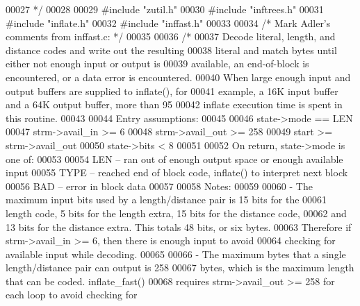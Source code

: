 \begin{DoxyCode}
{00027 \textcolor{comment}{ */}
00028 
00029 \textcolor{preprocessor}{#include "zutil.h"}
00030 \textcolor{preprocessor}{#include "inftrees.h"}
00031 \textcolor{preprocessor}{#include "inflate.h"}
00032 \textcolor{preprocessor}{#include "inffast.h"}
00033 
00034 \textcolor{comment}{/* Mark Adler's comments from inffast.c: */}
00035 
00036 \textcolor{comment}{/*}
00037 \textcolor{comment}{   Decode literal, length, and distance codes and write out the resulting}
00038 \textcolor{comment}{   literal and match bytes until either not enough input or output is}
00039 \textcolor{comment}{   available, an end-of-block is encountered, or a data error is encountered.}
00040 \textcolor{comment}{   When large enough input and output buffers are supplied to inflate(), for}
00041 \textcolor{comment}{   example, a 16K input buffer and a 64K output buffer, more than 95%
00042 \textcolor{comment}{   inflate execution time is spent in this routine.}
00043 \textcolor{comment}{}
00044 \textcolor{comment}{   Entry assumptions:}
00045 \textcolor{comment}{}
00046 \textcolor{comment}{        state->mode == LEN}
00047 \textcolor{comment}{        strm->avail\_in >= 6}
00048 \textcolor{comment}{        strm->avail\_out >= 258}
00049 \textcolor{comment}{        start >= strm->avail\_out}
00050 \textcolor{comment}{        state->bits < 8}
00051 \textcolor{comment}{}
00052 \textcolor{comment}{   On return, state->mode is one of:}
00053 \textcolor{comment}{}
00054 \textcolor{comment}{        LEN -- ran out of enough output space or enough available input}
00055 \textcolor{comment}{        TYPE -- reached end of block code, inflate() to interpret next block}
00056 \textcolor{comment}{        BAD -- error in block data}
00057 \textcolor{comment}{}
00058 \textcolor{comment}{   Notes:}
00059 \textcolor{comment}{}
00060 \textcolor{comment}{    - The maximum input bits used by a length/distance pair is 15 bits for the}
00061 \textcolor{comment}{      length code, 5 bits for the length extra, 15 bits for the distance code,}
00062 \textcolor{comment}{      and 13 bits for the distance extra.  This totals 48 bits, or six bytes.}
00063 \textcolor{comment}{      Therefore if strm->avail\_in >= 6, then there is enough input to avoid}
00064 \textcolor{comment}{      checking for available input while decoding.}
00065 \textcolor{comment}{}
00066 \textcolor{comment}{    - The maximum bytes that a single length/distance pair can output is 258}
00067 \textcolor{comment}{      bytes, which is the maximum length that can be coded.  inflate\_fast()}
00068 \textcolor{comment}{      requires strm->avail\_out >= 258 for each loop to avoid checking for}
}}
\end{DoxyCode}
